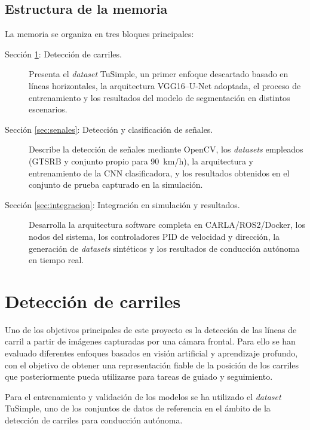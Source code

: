 \documentclass[12pt, a4paper]{article}
\begin{document}
\subsection*{Estructura de la memoria}

La memoria se organiza en tres bloques principales:

\begin{description}
    \item[Sección \ref{sec:carriles}: Detección de carriles.]
    Presenta el \textit{dataset} TuSimple, un primer enfoque descartado basado en líneas horizontales, la arquitectura VGG16--U-Net adoptada, el proceso de entrenamiento y los resultados del modelo de segmentación en distintos escenarios.
    \item[Sección \ref{sec:senales}: Detección y clasificación de señales.]
    Describe la detección de señales mediante OpenCV, los \textit{datasets} empleados (GTSRB y conjunto propio para 90~km/h), la arquitectura y entrenamiento de la CNN clasificadora, y los resultados obtenidos en el conjunto de prueba capturado en la simulación.
    \item[Sección \ref{sec:integracion}: Integración en simulación y resultados.]
    Desarrolla la arquitectura software completa en CARLA/ROS2/Docker, los nodos del sistema, los controladores PID de velocidad y dirección, la generación de \textit{datasets} sintéticos y los resultados de conducción autónoma en tiempo real.
\end{description}

\section{Detección de carriles}
\label{sec:carriles}
Uno de los objetivos principales de este proyecto es la detección de las líneas de carril a partir de imágenes capturadas por una cámara frontal. Para ello se han evaluado diferentes enfoques basados en visión artificial y aprendizaje profundo, con el objetivo de obtener una representación fiable de la posición de los carriles que posteriormente pueda utilizarse para tareas de guiado y seguimiento.

Para el entrenamiento y validación de los modelos se ha utilizado el \textit{dataset} TuSimple, uno de los conjuntos de datos de referencia en el ámbito de la detección de carriles para conducción autónoma.
\end{document}
